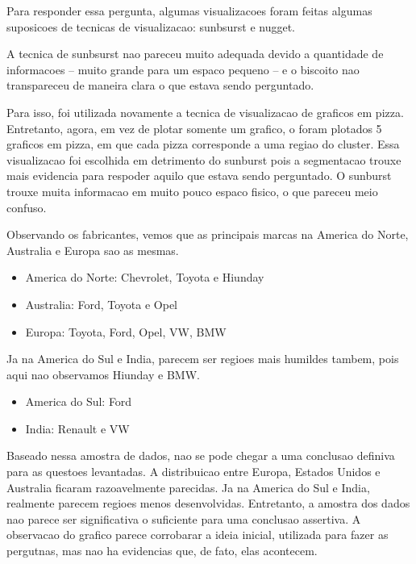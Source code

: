 \documentclass[10pt, conference]{IEEEtran}
\begin{document}
Para responder essa pergunta, algumas visualizacoes foram feitas algumas suposicoes de tecnicas
de visualizacao: sunbsurst e nugget. 

A tecnica de sunbsurst nao pareceu muito adequada devido a quantidade de informacoes -- muito grande para
um espaco pequeno -- e o biscoito nao transpareceu de maneira clara o que estava sendo perguntado.

Para isso, foi utilizada novamente a tecnica de visualizacao de graficos em pizza. Entretanto, agora,
em vez de plotar somente um grafico, o foram plotados 5 graficos em pizza, em que cada pizza corresponde
a uma regiao do cluster. Essa visualizacao foi escolhida em detrimento do sunburst pois a segmentacao
trouxe mais evidencia para respoder aquilo que estava sendo perguntado. O sunburst trouxe muita informacao
em muito pouco espaco fisico, o que pareceu meio confuso.

Observando os fabricantes, vemos que as principais marcas na America do Norte, Australia e Europa
sao as mesmas.

\begin{itemize}
  \item America do Norte: Chevrolet, Toyota e Hiunday
  \item Australia: Ford, Toyota e Opel
  \item Europa: Toyota, Ford, Opel, VW, BMW
\end{itemize}

Ja na America do Sul e India, parecem ser regioes mais humildes tambem, pois aqui nao observamos
Hiunday e BMW.

\begin{itemize}
  \item America do Sul: Ford
  \item India: Renault e VW
\end{itemize}

Baseado nessa amostra de dados, nao se pode chegar a uma conclusao definiva para as
questoes levantadas. A distribuicao entre Europa, Estados Unidos e Australia ficaram razoavelmente
parecidas. Ja na America do Sul e India, realmente parecem regioes menos desenvolvidas. Entretanto,
a amostra dos dados nao parece ser significativa o suficiente para uma conclusao assertiva. A observacao
do grafico parece corrobarar a ideia inicial, utilizada para fazer as pergutnas, mas nao ha evidencias
que, de fato, elas acontecem.

\end{document}
